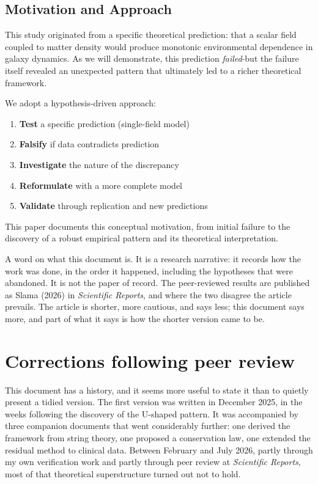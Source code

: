 \documentclass[12pt,a4paper]{article}
\begin{document}
\subsection{Motivation and Approach}

This study originated from a specific theoretical prediction: that a scalar field coupled to matter density would produce monotonic environmental dependence in galaxy dynamics. As we will demonstrate, this prediction \textit{failed}-but the failure itself revealed an unexpected pattern that ultimately led to a richer theoretical framework.

We adopt a hypothesis-driven approach:
\begin{enumerate}
    \item \textbf{Test} a specific prediction (single-field model)
    \item \textbf{Falsify} if data contradicts prediction
    \item \textbf{Investigate} the nature of the discrepancy
    \item \textbf{Reformulate} with a more complete model
    \item \textbf{Validate} through replication and new predictions
\end{enumerate}

This paper documents this conceptual motivation, from initial failure to the discovery of a robust empirical pattern and its theoretical interpretation.

A word on what this document is. It is a research narrative: it records how the work was done, in the order it happened, including the hypotheses that were abandoned. It is not the paper of record. The peer-reviewed results are published as Slama (2026) in \textit{Scientific Reports}, and where the two disagree the article prevails. The article is shorter, more cautious, and says less; this document says more, and part of what it says is how the shorter version came to be.

\section{Corrections following peer review}
\label{sec:corrections}

This document has a history, and it seems more useful to state it than to quietly present a tidied version. The first version was written in December 2025, in the weeks following the discovery of the U-shaped pattern. It was accompanied by three companion documents that went considerably further: one derived the framework from string theory, one proposed a conservation law, one extended the residual method to clinical data. Between February and July 2026, partly through my own verification work and partly through peer review at \textit{Scientific Reports}, most of that theoretical superstructure turned out not to hold.
\end{document}
